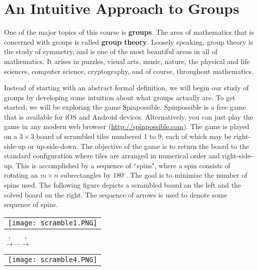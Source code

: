 \chapter{An Intuitive Approach to Groups}
\label{chapter:intuitive_approach_groups}
\thispagestyle{empty}

One of the major topics of this course is \textbf{groups}.  The area of mathematics that is concerned with groups is called \textbf{group theory}. Loosely speaking, group theory is the study of symmetry, and is one of the most beautiful areas in all of mathematics. It arises in puzzles, visual arts, music, nature, the physical and life sciences, computer science, cryptography, and of course, throughout mathematics.

Instead of starting with an abstract formal definition, we will begin our study of groups by developing some intuition about what groups actually are.  To get started, we will be exploring the game Spinpossible.   Spinpossible is a free game that is available for iOS and Android devices. Alternatively, you can just play the game in any modern web browser (\url{http://spinpossible.com}).  The game is played on a \(3\times 3\) board of scrambled tiles numbered 1 to 9, each of which may be right-side-up or up-side-down. The objective of the game is to return the board to the standard configuration where tiles are arranged in numerical order and right-side-up. This is accomplished by a sequence of ``spins", where a spin consists of rotating an \(m\times n\) subrectangles by 180\(^\circ\). The goal is to minimize the number of spins used.  The following figure depicts a scrambled board on the left and the solved board on the right.  The sequence of arrows is used to denote some sequence of spins.

\begin{center}
\begin{tabular}{c}\texttt{[image: scramble1.PNG]}\end{tabular}
{\large \(\xrightarrow{?} \cdots \xrightarrow{?}\)}
\begin{tabular}{c}\texttt{[image: scramble4.PNG]}\end{tabular}
\end{center}

